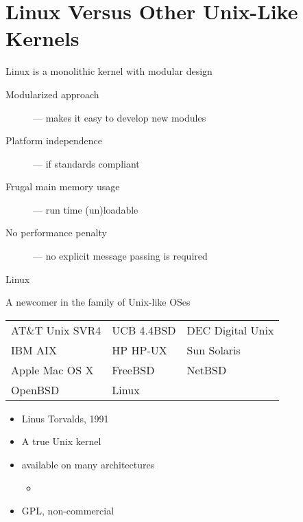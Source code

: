 \section{Linux Versus Other Unix-Like Kernels}
\label{sec:linux-versus-other}

\begin{frame}
  \begin{exampleblock}{Linux is a monolithic kernel with modular design}
    \begin{description}
    \item[Modularized approach] --- makes it easy to develop new modules
    \item[Platform independence] --- if standards compliant
    \item[Frugal main memory usage] --- run time (un)loadable
    \item[No performance penalty] --- no explicit message passing is required
    \end{description}
  \end{exampleblock}
\end{frame}

\begin{frame}{Linux}
  \begin{exampleblock}{A newcomer in the family of Unix-like OSes}
    \begin{center}
      \begin{tabular}{lll}
        AT\&T Unix SVR4&UCB 4.4BSD& DEC Digital Unix\\
        IBM AIX& HP HP-UX& Sun Solaris\\
        Apple Mac OS X& FreeBSD& NetBSD\\
        OpenBSD& Linux&
      \end{tabular}
    \end{center}
    \begin{itemize}
    \item Linus Torvalds, 1991
    \item A true Unix kernel
    \item available on many architectures
      \begin{itemize}
      \item {}
      \end{itemize}
    \item GPL, non-commercial
    \end{itemize}
  \end{exampleblock}
\end{frame}

